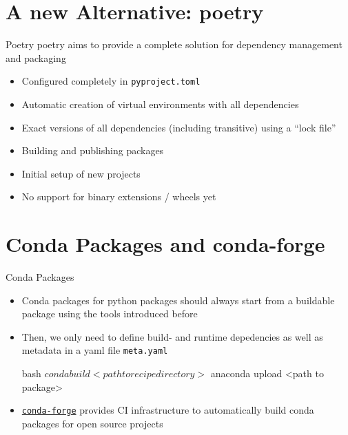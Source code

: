 \section{A new Alternative: poetry}
\begin{frame}[c]{Poetry}
  poetry aims to provide a complete solution for dependency management and packaging

  \begin{itemize}
    \item[\color{positive}\faPlus] Configured completely in \texttt{pyproject.toml}
    \item[\color{positive}\faPlus] Automatic creation of virtual environments with all dependencies
    \item[\color{positive}\faPlus] Exact versions of all dependencies (including transitive) using a \enquote{lock file}
    \item[\color{positive}\faPlus] Building and publishing packages
    \item[\color{positive}\faPlus] Initial setup of new projects
    \item[\color{negative}\faMinus] No support for binary extensions / wheels yet
  \end{itemize}
\end{frame}


\section{Conda Packages and conda-forge}

\begin{frame}[c, fragile]{Conda Packages}
  \begin{itemize}
    \item Conda packages for python packages should always start from a buildable package using the tools introduced before
    \item Then, we only need to define build- and runtime depedencies as well as metadata in a yaml file \texttt{meta.yaml}
      \begin{code}{bash}
        $ conda build <path to recipe directory>
        $ anaconda upload <path to package>
      \end{code}
    \item \href{https://conda-forge.org/}{\texttt{conda-forge}} provides CI infrastructure to automatically build conda packages for open source projects
  \end{itemize}
\end{frame}

